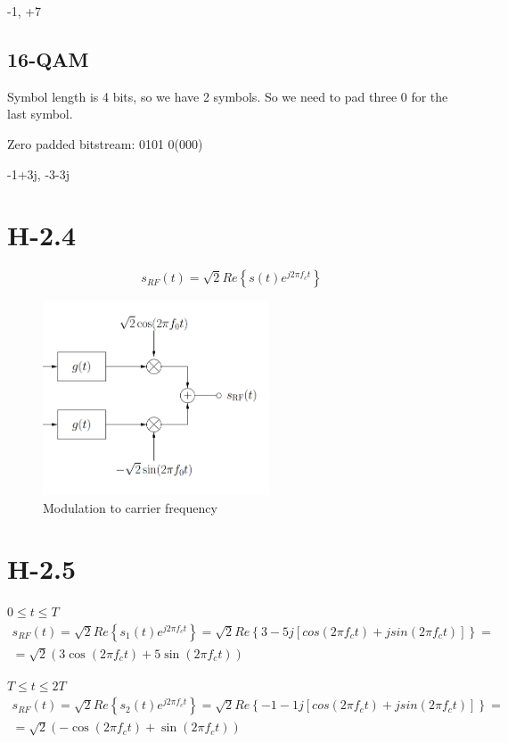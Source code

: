 \documentclass{article}
\begin{document}
-1, +7

\subsection{16-QAM}
Symbol length is 4 bits, so we have 2 symbols. So we need to pad three 0 for the last symbol.

Zero padded bitstream: 0101 0(000)

-1+3j, -3-3j

\section{H-2.4}

\begin{equation}
s_{RF}(t) = \sqrt{2}Re\left\{s(t)e^{j2\pi f_{c}t}\right\}
\end{equation}

\begin{figure}[h]
\centering
\includegraphics[width=0.6\textwidth]{modulation.png}
\caption{Modulation to carrier frequency}
\label{fig:modulation}
\end{figure}

\section{H-2.5}

$0\le t \le T$
\begin{align}
    s_{RF}(t) = \sqrt{2}Re\left\{s_1(t)e^{j2\pi f_{c}t}\right\} = \sqrt{2} Re\left\{3-5j[cos(2\pi f_{c}t) + j sin(2\pi f_{c}t)]\right\} = \\\nonumber
    = \sqrt{2}(3\cos(2\pi f_{c}t) + 5\sin(2\pi f_{c}t))
\end{align}

$T\le t \le 2T$
\begin{align}
    s_{RF}(t) = \sqrt{2}Re\left\{s_2(t)e^{j2\pi f_{c}t}\right\} = \sqrt{2} Re\left\{-1-1j[cos(2\pi f_{c}t) + j sin(2\pi f_{c}t)]\right\} = \\\nonumber
    = \sqrt{2}(-\cos(2\pi f_{c}t) + \sin(2\pi f_{c}t))
\end{align}
\end{document}
